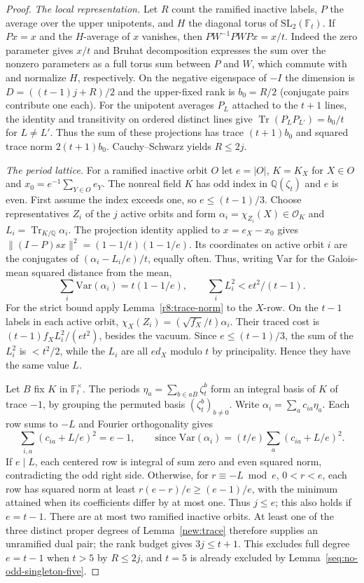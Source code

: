 \documentclass[11pt,a4paper]{article}
\numberwithin{equation}{section}
\theoremstyle{remark}
\begin{document}
\begin{proof}
\emph{The local representation.} Let $R$ count the ramified inactive labels, $P$ the average over the
upper unipotents, and $H$ the diagonal torus of
$\mathrm{SL}_2(\mathbb F_t)$. If $Px=x$ and the $H$-average of $x$
vanishes, then $PW^{-1}PWPx=x/t$. Indeed the zero parameter gives
$x/t$ and Bruhat decomposition expresses the sum over the nonzero
parameters as a full torus sum between $P$ and $W$, which commute
with and normalize $H$, respectively. On the negative eigenspace
of $-I$ the dimension is $D=((t-1)j+R)/2$ and the upper-fixed rank
is $b_0=R/2$ (conjugate pairs contribute one each). For the unipotent
averages $P_L$ attached to the $t+1$ lines, the identity and
transitivity on ordered distinct lines give
$\operatorname{Tr}(P_LP_{L'})=b_0/t$ for $L\ne L'$. Thus the sum
of these projections has trace $(t+1)b_0$ and squared trace norm
$2(t+1)b_0$. Cauchy--Schwarz yields $R\le2j$.

\emph{The period lattice.} For a ramified inactive orbit $O$ let $e=|O|$, $K=K_X$ for $X\in O$
and $x_0=e^{-1}\sum_{Y\in O}e_Y$. The nonreal field $K$ has odd
index in $\mathbb Q(\zeta_t)$ and $e$ is even. First assume the
index exceeds one, so $e\le(t-1)/3$. Choose representatives $Z_i$
of the $j$ active orbits and form $\alpha_i=\chi_{Z_i}(X)\in\mathcal O_K$
and $L_i=\operatorname{Tr}_{K/\mathbb Q}\alpha_i$. The projection
identity applied to $x=e_X-x_0$ gives
$\|(I-P)sx\|^2=(1-1/t)(1-1/e)$. Its coordinates on active orbit $i$
are the conjugates of $(\alpha_i-L_i/e)/t$, equally often. Thus, writing
$\mathrm{Var}$ for the Galois-mean squared distance from the mean,
\[
 \sum_i\mathrm{Var}(\alpha_i)=t(1-1/e),\qquad
 \sum_i L_i^2< et^2/(t-1).
\]
For the strict bound apply Lemma~\ref{r8:trace-norm} to the $X$-row.
On the $t-1$ labels in each active orbit,
$\chi_X(Z_i)=(\sqrt{f_X}/t)\alpha_i$. Their traced cost is
$(t-1)f_X L_i^2/(et^2)$, besides the vacuum. Since $e\le(t-1)/3$, the sum of the $L_i^2$
is $<t^2/2$, while the $L_i$ are all
$ed_X$ modulo $t$ by principality. Hence they have the same value $L$.

Let $B$ fix $K$ in $\mathbb F_t^\times$. The periods
$\eta_a=\sum_{b\in aB}\zeta_t^b$ form an integral basis of $K$ of
trace $-1$, by grouping the permuted basis $(\zeta_t^b)_{b\ne0}$.
Write $\alpha_i=\sum_a c_{ia}\eta_a$. Each row sums to $-L$ and
Fourier orthogonality gives
\[
 \sum_{i,a}(c_{ia}+L/e)^2=e-1,
 \qquad\text{since }\mathrm{Var}(\alpha_i)=
 (t/e)\sum_a(c_{ia}+L/e)^2.
\]
If $e\mid L$, each centered row is integral of sum zero and even
squared norm, contradicting the odd right side. Otherwise, for
$r\equiv -L\bmod e$, $0<r<e$, each row has squared norm at least
$r(e-r)/e\ge(e-1)/e$, with the minimum attained when its coefficients
differ by at most one. Thus $j\le e$; this also holds if $e=t-1$.
There are at most two ramified inactive orbits. At least one of the
three distinct proper degrees of Lemma~\ref{new:trace} therefore supplies an unramified
dual pair; the rank budget gives $3j\le t+1$. This excludes full
degree $e=t-1$ when $t>5$ by $R\le2j$, and $t=5$ is already
excluded by Lemma~\ref{seq:no-odd-singleton-five}.


\end{proof}
\end{document}
